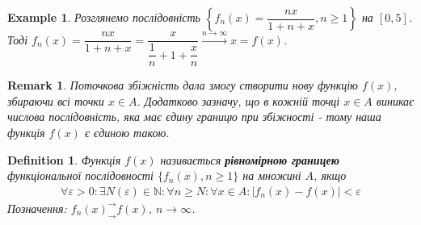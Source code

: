 \documentclass[a4paper, 10pt]{article}
\theoremstyle{theoremdd}
\theoremstyle{theoremdd}
\theoremstyle{theoremdd}
\newtheorem{definition}[theorem]{Definition}
\theoremstyle{theoremdd}
\theoremstyle{theoremdd}
\newtheorem{example}[theorem]{Example}
\theoremstyle{theoremdd}
\theoremstyle{theoremdd}
\newtheorem{remark}[theorem]{Remark}
\theoremstyle{theoremdd}
\theoremstyle{theoremdd}
\begin{document}
\begin{example}
Розглянемо послідовність $\left\{ f_n(x) = \dfrac{nx}{1+n+x}, n \geq 1 \right\}$ на $[0,5]$.\\
Тоді $f_n(x) = \dfrac{nx}{1+n+x} = \dfrac{x}{\dfrac{1}{n}+ 1 + \dfrac{x}{n}} \overset{n \to \infty}{\longrightarrow} x = f(x)$.
\end{example}

\begin{remark}
Поточкова збіжність дала змогу створити нову функцію $f(x)$, збираючи всі точки $x \in A$. Додатково зазначу, що в кожній точці $x \in A$ виникає числова послідовність, яка має єдину границю при збіжності - тому наша функція $f(x)$ є єдиною такою. 
\end{remark}

\begin{definition}
Функція $f(x)$ називається \textbf{рівномірною границею} функціональної послідовності $\{f_n(x), n \geq 1 \}$ на множині $A$, якщо
\begin{align*}
\forall \varepsilon > 0: \exists N(\varepsilon) \in \mathbb{N}: \forall n \geq N: \forall x \in A: |f_n(x)-f(x)| < \varepsilon
\end{align*}
Позначення: $f_n(x)^\rightarrow_\rightarrow f(x)$, $n \to \infty$.
\end{definition}
\end{document}

